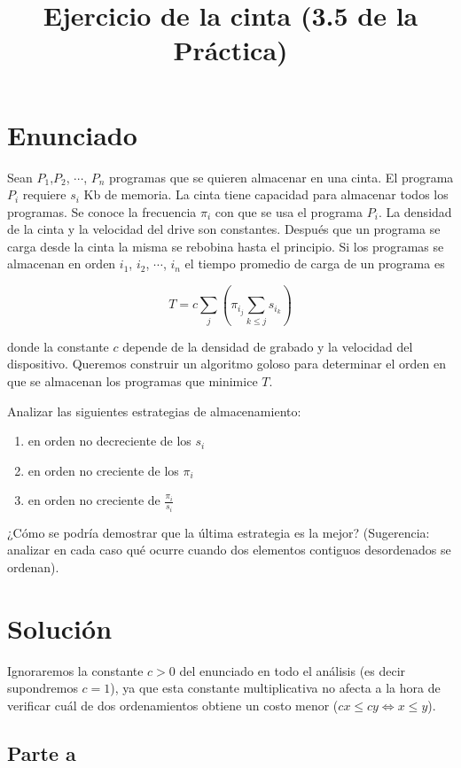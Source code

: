 \documentclass{article}
\title{Ejercicio de la cinta (3.5 de la Práctica)}
\author{}
\date{}
\begin{document}
\maketitle

\section{Enunciado}

Sean $P_1$,$P_2$, $\cdots$, $P_n$ programas que se quieren almacenar en una cinta. El programa $P_i$ requiere $s_i$ Kb de memoria. La cinta tiene capacidad
para almacenar todos los programas. Se conoce la frecuencia $\pi_i$ con que se usa el programa $P_i$. La densidad de la cinta y la velocidad del drive
son constantes. Después que un programa se carga desde la cinta la misma se rebobina hasta el principio. Si los programas se almacenan en orden $i_1$, $i_2$,
$\cdots$, $i_n$ el tiempo promedio de carga de un programa es

$$T = c \sum_{j}{\left ( \pi_{i_j} \sum_{k \leq j}{s_{i_k}}  \right )}$$

donde la constante $c$ depende de la densidad de grabado y la velocidad del dispositivo. Queremos construir un algoritmo goloso para determinar el orden
en que se almacenan los programas que minimice $T$.

Analizar las siguientes estrategias de almacenamiento:

\begin{enumerate}
\item en orden no decreciente de los $s_i$
\item en orden no creciente de los $\pi_i$
\item en orden no creciente de $\frac{\pi_i}{s_i}$
\end{enumerate}

¿Cómo se podría demostrar que la última estrategia es la mejor?
(Sugerencia: analizar en cada caso qué ocurre cuando dos elementos contiguos desordenados se ordenan).

\section{Solución}

Ignoraremos la constante $c > 0$ del enunciado en todo el análisis (es decir supondremos $c=1$), ya que esta constante multiplicativa no afecta a la hora de verificar cuál de dos ordenamientos
obtiene un costo menor ($cx \leq cy \Leftrightarrow x \leq y$).

\subsection{Parte a}
\end{document}
